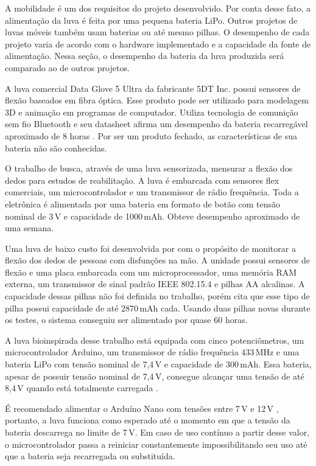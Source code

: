 \documentclass[
	12pt,				%
	openright,			%
	oneside,			%
	a4paper,			%
	english,			%
	brazil				%
	]{abntex2}
\begin{document}
			A mobilidade é um dos requisitos do projeto desenvolvido. Por conta desse fato, a alimentação da luva é feita por uma pequena bateria LiPo. Outros projetos de luvas móveis também usam baterias ou até mesmo pilhas. O desempenho de cada projeto varia de acordo com o hardware implementado e a capacidade da fonte de alimentação. Nessa seção, o desempenho da bateria da luva produzida será comparado ao de outros projetos.

			A luva comercial Data Glove 5 Ultra da fabricante 5DT Inc. possui sensores de flexão baseados em fibra óptica. Esse produto pode ser utilizado para modelagem 3D e animação em programas de computador. Utiliza tecnologia de comunição sem fio Bluetooth e seu datasheet afirma um desempenho da bateria recarregável aproximado de 8 horas \cite{5DT-ultra}. Por ser um produto fechado, as características de sua bateria não são conhecidas.

			O trabalho de \cite{michela2013rehab} busca, através de uma luva sensorizada, mensurar a flexão dos dedos para estudos de reabilitação. A luva é embarcada com sensores flex comerciais, um microcontrolador e um transmissor de rádio frequência. Toda a eletrônica é alimentada por uma bateria em formato de botão com tensão nominal de 3$\,$V e capacidade de 1000$\,$mAh. Obteve desempenho aproximado de uma semana.
			
			Uma luva de baixo custo foi desenvolvida por \cite{simone2007lowcost} com o propósito de monitorar a flexão dos dedos de pessoas com disfunções na mão. A unidade possui sensores de flexão e uma placa embarcada com um microprocessador, uma memória RAM externa, um transmissor de sinal padrão IEEE 802.15.4 e pilhas AA alcalinas. A capacidade dessas pilhas não foi definida no trabalho, porém \cite{buchmann2016batteries} cita que esse tipo de pilha possui capacidade de até 2870$\,$mAh cada. Usando duas pilhas novas durante os testes, o sistema conseguiu ser alimentado por quase 60 horas.

			A luva bioinspirada desse trabalho está equipada com cinco potenciômetros, um microcontrolador Arduino, um transmissor de rádio frequência 433$\,$MHz e uma bateria LiPo com tensão nominal de 7,4$\,$V e capacidade de 300$\,$mAh. Essa bateria, apesar de possuir tensão nominal de 7,4$\,$V, consegue alcançar uma tensão de até 8,4$\,$V quando está totalmente carregada \cite{buchmann2016batteries}.

			É recomendado alimentar o Arduíno Nano com tensões entre 7$\,$V e 12$\,$V \cite{arduinopowerrange}, portanto, a luva funciona como esperado até o momento em que a tensão da bateria descarrega no limite de 7$\,$V. Em caso de uso contínuo a partir desse valor, o microcontrolador passa a reiniciar constantemente impossibilitando seu uso até que a bateria seja recarregada ou substituída.
\end{document}
